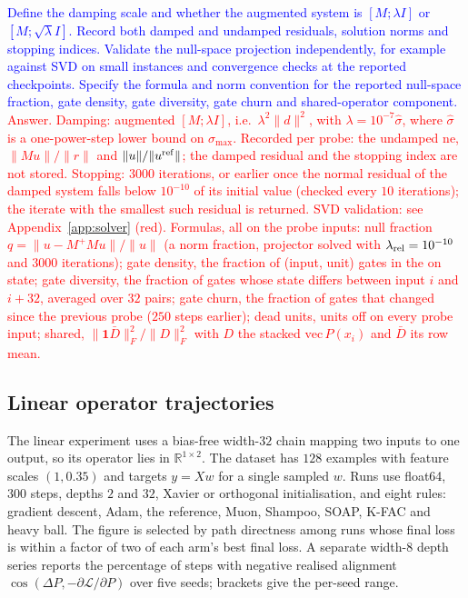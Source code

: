 \documentclass{article}
\newcommand{\zied}[1]{\textcolor{blue}{#1}}
\newcommand{\nat}[1]{\textcolor{red}{#1}}
\theoremstyle{definition}
\theoremstyle{remark}
\begin{document}
\zied{Define the damping scale and whether the augmented system is $[M;\lambda I]$ or $[M;\sqrt\lambda I]$. Record both damped and undamped residuals, solution norms and stopping indices. Validate the null-space projection independently, for example against SVD on small instances and convergence checks at the reported checkpoints. Specify the formula and norm convention for the reported null-space fraction, gate density, gate diversity, gate churn and shared-operator component.}
\nat{Answer. Damping: augmented $[M;\lambda I]$, i.e.\ $\lambda^2\|d\|^2$, with $\lambda=10^{-7}\hat\sigma$, where $\hat\sigma$ is a one-power-step lower bound on $\sigma_{\max}$. Recorded per probe: the undamped $\mathrm{ne}$, $\|Mu\|/\|r\|$ and $\|u\|/\|u^{\rm ref}\|$; the damped residual and the stopping index are not stored. Stopping: $3000$ iterations, or earlier once the normal residual of the damped system falls below $10^{-10}$ of its initial value (checked every $10$ iterations); the iterate with the smallest such residual is returned. SVD validation: see Appendix~\ref{app:solver} (red). Formulas, all on the probe inputs: null fraction $q=\|u-M^+Mu\|/\|u\|$ (a norm fraction, projector solved with $\lambda_{\rm rel}=10^{-10}$ and $3000$ iterations); gate density, the fraction of (input, unit) gates in the on state; gate diversity, the fraction of gates whose state differs between input $i$ and $i+32$, averaged over $32$ pairs; gate churn, the fraction of gates that changed since the previous probe ($250$ steps earlier); dead units, units off on every probe input; shared, $\|\mathbf1\bar D\|_F^2/\|D\|_F^2$ with $D$ the stacked $\mathrm{vec}\,P(x_i)$ and $\bar D$ its row mean.}

\subsection{Linear operator trajectories}\label{app:e2}

The linear experiment uses a bias-free width-$32$ chain mapping two inputs to one output, so its operator lies in $\mathbb R^{1\times2}$. The dataset has $128$ examples with feature scales $(1,0.35)$ and targets $y=Xw$ for a single sampled $w$. Runs use float64, $300$ steps, depths $2$ and $32$, Xavier or orthogonal initialisation, and eight rules: gradient descent, Adam, the reference, Muon, Shampoo, SOAP, K-FAC and heavy ball. The figure is selected by path directness among runs whose final loss is within a factor of two of each arm's best final loss. A separate width-$8$ depth series reports the percentage of steps with negative realised alignment $\cos(\Delta P,-\partial\mathcal L/\partial P)$ over five seeds; brackets give the per-seed range.
\end{document}
